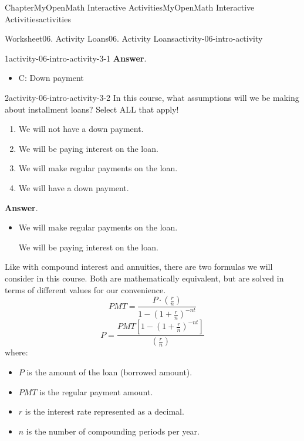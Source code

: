 \documentclass[oneside,10pt,]{book}
\newcommand{\blocktitlefont}{\relax}
\newcommand{\ptxlistdisc}{\raisebox{0.3ex}{\textbullet}}
\begin{document}
\begin{chapterptx}{Chapter}{MyOpenMath Interactive Activities}{}{MyOpenMath Interactive Activities}{}{}{activities}
\begin{worksheet-section}{Worksheet}{06. Activity Loans}{}{06. Activity Loans}{}{}{activity-06-intro-activity}
\begin{divisionexercise}{1}{}{}{activity-06-intro-activity-3-1}
\noindent\textbf{\blocktitlefont Answer}.\hypertarget{activity-06-intro-activity-3-1-2}{}\quad{}%
\begin{itemize}[label=\ptxlistdisc]
\item{}C: Down payment%
\end{itemize}
%
\end{divisionexercise}%
\begin{divisionexercise}{2}{}{}{activity-06-intro-activity-3-2}%
In this course, what assumptions will we be making about installment loans? Select ALL that apply!%
\par
%
\begin{enumerate}[label={(\alph*)}]
\item{}We will not have a down payment.%
\item{}We will be paying interest on the loan.%
\item{}We will make regular payments on the loan.%
\item{}We will have a down payment.%
\end{enumerate}
%
\par\smallskip%
\noindent\textbf{\blocktitlefont Answer}.\hypertarget{activity-06-intro-activity-3-2-2}{}\quad{}%
\begin{itemize}[label=\ptxlistdisc]
\item{}We will make regular payments on the loan.%
\par
We will be paying interest on the loan.%
\end{itemize}
%
\end{divisionexercise}%
\clearpage
Like with compound interest and annuities, there are two formulas we will consider in this course. Both are mathematically equivalent, but are solved in terms of different values for our convenience.%
\begin{equation*}
PMT = \frac{P \cdot (\frac{r}{n})}{1 - \left(1 + \frac{r}{n}\right)^{-nt}}
\end{equation*}
%
\begin{equation*}
P = \frac{PMT\left[1 - \left(1 + \frac{r}{n}\right)^{-nt}\right]}{(\frac{r}{n})}
\end{equation*}
where:%
\begin{itemize}[label=\ptxlistdisc]
\item{}\(P\) is the amount of the loan (borrowed amount).%
\item{}\(PMT\) is the regular payment amount.%
\item{}\(r\) is the interest rate represented as a decimal.%
\item{}\(n\) is the number of compounding periods per year.%

\end{itemize}
\end{worksheet-section}
\end{chapterptx}
\end{document}

